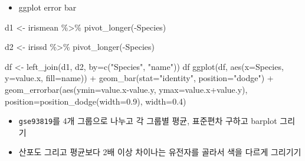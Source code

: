\documentclass[
]{book}
\newenvironment{Shaded}{\begin{snugshade}}{\end{snugshade}}
\newcommand{\AttributeTok}[1]{\textcolor[rgb]{0.77,0.63,0.00}{#1}}
\newcommand{\FloatTok}[1]{\textcolor[rgb]{0.00,0.00,0.81}{#1}}
\newcommand{\FunctionTok}[1]{\textcolor[rgb]{0.00,0.00,0.00}{#1}}
\newcommand{\NormalTok}[1]{#1}
\newcommand{\OtherTok}[1]{\textcolor[rgb]{0.56,0.35,0.01}{#1}}
\newcommand{\SpecialCharTok}[1]{\textcolor[rgb]{0.00,0.00,0.00}{#1}}
\newcommand{\StringTok}[1]{\textcolor[rgb]{0.31,0.60,0.02}{#1}}
\providecommand{\tightlist}{%
  \setlength{\itemsep}{0pt}\setlength{\parskip}{0pt}}
\begin{document}
\begin{itemize}
\tightlist
\item
  ggplot error bar
\end{itemize}

\begin{Shaded}
\begin{Highlighting}[]

\NormalTok{d1 }\OtherTok{\textless{}{-}}\NormalTok{ irismean }\SpecialCharTok{\%\textgreater{}\%} 
  \FunctionTok{pivot\_longer}\NormalTok{(}\SpecialCharTok{{-}}\NormalTok{Species)}

\NormalTok{d2 }\OtherTok{\textless{}{-}}\NormalTok{ irissd }\SpecialCharTok{\%\textgreater{}\%} 
  \FunctionTok{pivot\_longer}\NormalTok{(}\SpecialCharTok{{-}}\NormalTok{Species)}

\NormalTok{df }\OtherTok{\textless{}{-}} \FunctionTok{left\_join}\NormalTok{(d1, d2, }\AttributeTok{by=}\FunctionTok{c}\NormalTok{(}\StringTok{"Species"}\NormalTok{, }\StringTok{"name"}\NormalTok{))}
\NormalTok{df}
\FunctionTok{ggplot}\NormalTok{(df, }\FunctionTok{aes}\NormalTok{(}\AttributeTok{x=}\NormalTok{Species, }\AttributeTok{y=}\NormalTok{value.x, }\AttributeTok{fill=}\NormalTok{name)) }\SpecialCharTok{+}
  \FunctionTok{geom\_bar}\NormalTok{(}\AttributeTok{stat=}\StringTok{"identity"}\NormalTok{, }\AttributeTok{position=}\StringTok{"dodge"}\NormalTok{) }\SpecialCharTok{+}
  \FunctionTok{geom\_errorbar}\NormalTok{(}\FunctionTok{aes}\NormalTok{(}\AttributeTok{ymin=}\NormalTok{value.x}\SpecialCharTok{{-}}\NormalTok{value.y, }\AttributeTok{ymax=}\NormalTok{value.x}\SpecialCharTok{+}\NormalTok{value.y),}
                \AttributeTok{position=}\FunctionTok{position\_dodge}\NormalTok{(}\AttributeTok{width=}\FloatTok{0.9}\NormalTok{), }
                \AttributeTok{width=}\FloatTok{0.4}\NormalTok{)}
\end{Highlighting}
\end{Shaded}

\begin{itemize}
\tightlist
\item
  \texttt{gse93819}를 4개 그룹으로 나누고 각 그룹별 평균, 표준편차 구하고 barplot 그리기
\item
  산포도 그리고 평균보다 2배 이상 차이나는 유전자를 골라서 색을 다르게 그리기기
\end{itemize}
\end{document}
